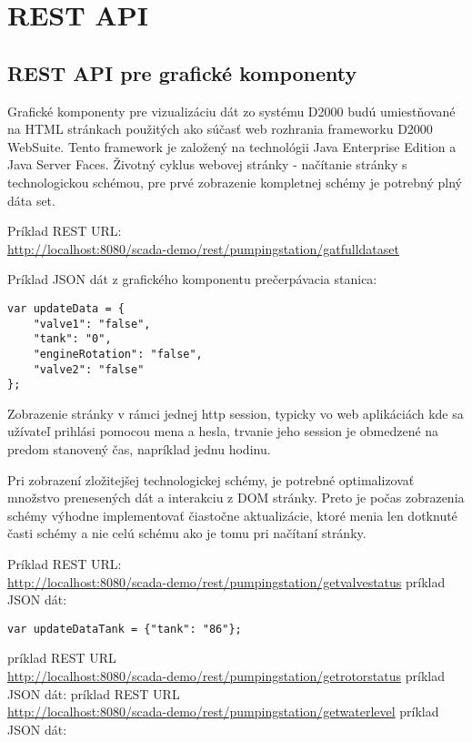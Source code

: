\chapter{REST API}

\section{REST API pre grafické komponenty}
Grafické komponenty pre vizualizáciu dát zo systému D2000 budú umiestňované na HTML stránkach použitých ako súčasť web rozhrania frameworku D2000 WebSuite. Tento framework je založený na technológii Java Enterprise Edition a Java Server Faces. Životný cyklus webovej stránky - načítanie stránky s technologickou schémou, pre prvé zobrazenie kompletnej schémy je potrebný plný dáta set.


Príklad REST URL:\\
\url{http://localhost:8080/scada-demo/rest/pumpingstation/gatfulldataset}


Príklad JSON dát z grafického komponentu prečerpávacia stanica: 
\begin{lstlisting}
var updateData = {
	"valve1": "false",
	"tank": "0",
	"engineRotation": "false",
	"valve2": "false"
};
\end{lstlisting}


Zobrazenie stránky v rámci jednej http session, typicky vo web aplikáciách kde sa užívateľ prihlási pomocou mena a hesla, trvanie jeho session je obmedzené na predom stanovený čas, napríklad jednu hodinu.


Pri zobrazení zložitejšej technologickej schémy, je potrebné optimalizovať množstvo prenesených dát a interakciu z DOM stránky. Preto je počas zobrazenia schémy výhodne implementovať čiastočne aktualizácie, ktoré menia len dotknuté časti schémy a nie celú schému ako je tomu pri načítaní stránky.  

Príklad REST URL:\\ 
\url{http://localhost:8080/scada-demo/rest/pumpingstation/getvalvestatus}
príklad JSON dát:
\begin{lstlisting}
var updateDataTank = {"tank": "86"};
\end{lstlisting}

príklad REST URL\\ \url{http://localhost:8080/scada-demo/rest/pumpingstation/getrotorstatus}
príklad JSON dát: %
príklad REST URL\\ \url{http://localhost:8080/scada-demo/rest/pumpingstation/getwaterlevel}
príklad JSON dát: %


